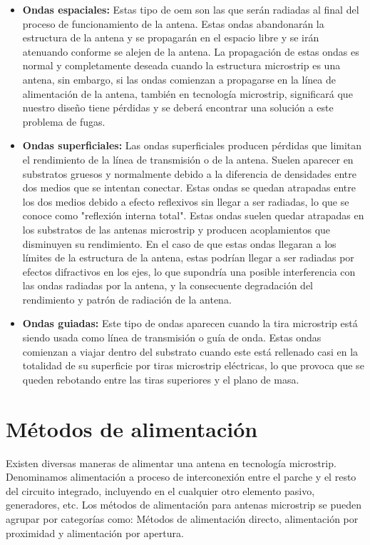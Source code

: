 \begin{itemize}
\item \textbf{Ondas espaciales: }Estas tipo de \gls{oem} son las que serán radiadas al final del proceso de funcionamiento de la antena. Estas ondas abandonarán la estructura de la antena y se propagarán en el espacio libre y se irán atenuando conforme se alejen de la antena. La propagación de estas ondas es normal y completamente deseada cuando la estructura microstrip es una antena, sin embargo, si las ondas comienzan a propagarse en la línea de alimentación de la antena, también en tecnología microstrip, significará que nuestro diseño tiene pérdidas y se deberá encontrar una solución a este problema de fugas.

\item \textbf{Ondas superficiales: }Las ondas superficiales producen pérdidas que limitan el rendimiento de la línea de transmisión o de la antena. Suelen aparecer en substratos gruesos y normalmente debido a la diferencia de densidades entre dos medios que se intentan conectar. Estas ondas se quedan atrapadas entre los dos medios debido a efecto reflexivos sin llegar a ser radiadas, lo que se conoce como "reflexión interna total". Estas ondas suelen quedar atrapadas en los substratos de las antenas microstrip y producen acoplamientos que disminuyen su rendimiento. En el caso de que estas ondas llegaran a los límites de la estructura de la antena, estas podrían llegar a ser radiadas por efectos difractivos en los ejes, lo que supondría una posible interferencia con las ondas radiadas por la antena, y la consecuente degradación del rendimiento y patrón de radiación de la antena.

\item \textbf{Ondas guiadas: }Este tipo de ondas aparecen cuando la tira microstrip está siendo usada como línea de transmisión o guía de onda. Estas ondas comienzan a viajar dentro del substrato cuando este está rellenado casi en la totalidad de su superficie por tiras microstrip eléctricas, lo que provoca que se queden rebotando entre las tiras superiores y el plano de masa.
\end{itemize}

\section{Métodos de alimentación}

\par Existen diversas maneras de alimentar una antena en tecnología microstrip. Denominamos alimentación a proceso de interconexión entre el parche y el resto del circuito integrado, incluyendo en el cualquier otro elemento pasivo, generadores, etc. Los métodos de alimentación para antenas microstrip se pueden agrupar por categorías como: Métodos de alimentación directo, alimentación por proximidad y alimentación por apertura. \cite{Aquino2008}

